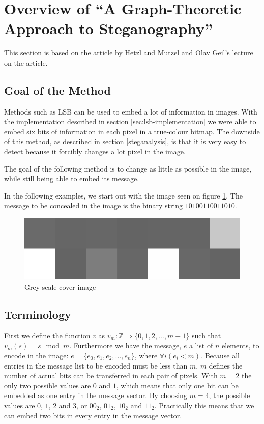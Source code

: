 \clearpage
\section{Overview of ``A Graph-Theoretic Approach to Steganography''}
\label{sec:graphtheory}
{\footnotesize This section is based on the article by Hetzl and Mutzel\citep{hetzl_2005} and Olav Geil's lecture on the article.}

\subsection{Goal of the Method}
Methods such as LSB can be used to embed a lot of information in images. 
With the implementation described in section \ref{sec:lsb-implementation} we were able to embed six bits of information in each pixel in a true-colour bitmap. 
The downside of this method, as described in section \ref{steganalysis}, is that it is very easy to detect because it forcibly changes a lot pixel in the image. 

The goal of the following method is to change as little as possible in the image, while still being able to embed its message.

In the following examples, we start out with the image seen on figure \ref{fig:startingImage}.
The message to be concealed in the image is the binary string $10100110011010$.

\begin{figure}[h!]
	\centering
	\includegraphics[width=.4\textwidth, frame]{figures/pixelgrid.png}
	\caption{Grey-scale cover image}
	\label{fig:startingImage}
\end{figure}

\subsection{Terminology}
First we define the function $v$ as $ v_m: \mathds{Z} \Rightarrow \{0,1,2,\ldots,m-1\} $ such that $ v_m(s) = s \mod m $. 
Furthermore we have the message, $e$ a list of $n$ elements, to encode in the image: $e = \{ e_0, e_1, e_2, \ldots, e_n \}$, where $\forall i\left( e_i < m \right)$. 
Because all entries in the message list to be encoded must be less than $m$, $m$ defines the number of actual bits can be transferred in each pair of pixels. With $m = 2$ the only two possible values are $0$ and $1$, which means that only one bit can be embedded as one entry in the message vector.
By choosing $m = 4$, the possible values are $0$, $1$, $2$ and $3$, or $00_2$, $01_2$, $10_2$ and $11_2$.
Practically this means that we can embed two bits in every entry in the message vector. 

